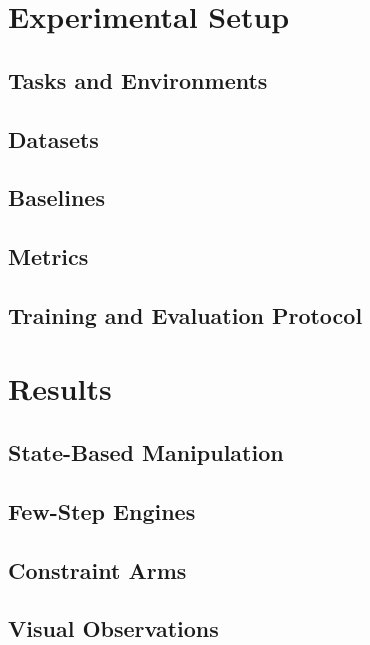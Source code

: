 \documentclass[headsepline,footsepline,footinclude=false,oneside,fontsize=11pt,paper=a4,listof=totoc,bibliography=totoc]{scrbook}
\begin{document}

\chapter{Experimental Setup}\label{ch:setup}
\section{Tasks and Environments}\label{sec:setup:tasks}
\section{Datasets}\label{sec:setup:data}
\section{Baselines}\label{sec:setup:baselines}
\section{Metrics}\label{sec:setup:metrics}
\section{Training and Evaluation Protocol}\label{sec:setup:protocol}

\chapter{Results}\label{ch:results}
\section{State-Based Manipulation}\label{sec:res:state}
\section{Few-Step Engines}\label{sec:res:fewstep}
\section{Constraint Arms}\label{sec:res:constraints}
\section{Visual Observations}\label{sec:res:visual}
\end{document}
